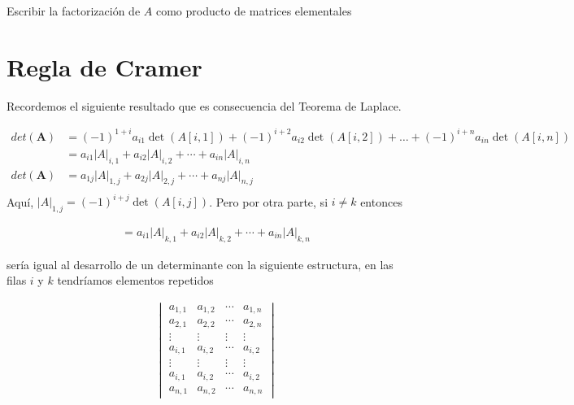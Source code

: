 \documentclass[
]{article}
\begin{document}
Escribir la factorización de \(A\) como producto de matrices elementales

\hypertarget{regla-de-cramer}{%
\section{Regla de Cramer}\label{regla-de-cramer}}

Recordemos el siguiente resultado que es consecuencia del Teorema de
Laplace.

\begin{equation}
\begin{array}{cc}
det(\mathbf{A}) &=  (-1)^{1+i}a_{i1}\det(A[i,1]) +(-1)^{i+2} a_{i2}\det(A[i,2]) + \ldots +(-1)^{i+n} a_{in}\det(A[i,n]) \\
                & = a_{i1}|A|_{i,1}+a_{i2}|A|_{i,2}+ \cdots + a_{in}|A|_{i,n}                         \\
det(\mathbf{A}) &=   a_{1j}|A|_{1,j}+a_{2j}|A|_{2,j}+ \cdots + a_{nj}|A|_{n,j}                         \\
                                   
\end{array}
\end{equation} Aquí, \(|A|_{1,j} = (-1)^{i+j}\det(A[i,j])\). Pero por
otra parte, si \(i\ne k\) entonces

\begin{equation}
\begin{array}{cc}
   &=  a_{i1}|A|_{k,1}+a_{i2}|A|_{k,2}+ \cdots + a_{in}|A|_{k,n}                         
\end{array}
\end{equation}

sería igual al desarrollo de un determinante con la siguiente
estructura, en las filas \(i\) y \(k\) tendríamos elementos repetidos

\begin{equation}
\begin{array}{cc}
   & \begin{vmatrix}
            a_{1,1}      &a_{1,2}    & \cdots     & a_{1,n}      \\ 
            a_{2,1}      &a_{2,2}    & \cdots     & a_{2,n}      \\
            \vdots       & \vdots    & \vdots     & \vdots       \\
            a_{i,1}      &a_{i,2}    & \cdots     & a_{i,2}      \\  
            \vdots       & \vdots    & \vdots    & \vdots         \\
            a_{i,1}      &a_{i,2}    & \cdots     & a_{i,2}      \\  
            a_{n,1}      &a_{n,2}    & \cdots     & a_{n,n} 
   \end{vmatrix}
\end{array}
\end{equation}
\end{document}
